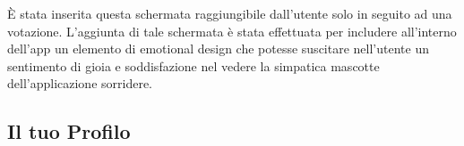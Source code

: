 È stata inserita questa schermata raggiungibile dall'utente solo in seguito ad una votazione. L'aggiunta di tale schermata è stata effettuata per includere all'interno dell'app un elemento di emotional design che potesse suscitare nell'utente un sentimento di gioia e soddisfazione nel vedere la simpatica mascotte dell'applicazione sorridere.

\subsection{Il tuo Profilo}

\begin{figure}[htp]
    \centering
     \quad
     \quad

\end{figure}
